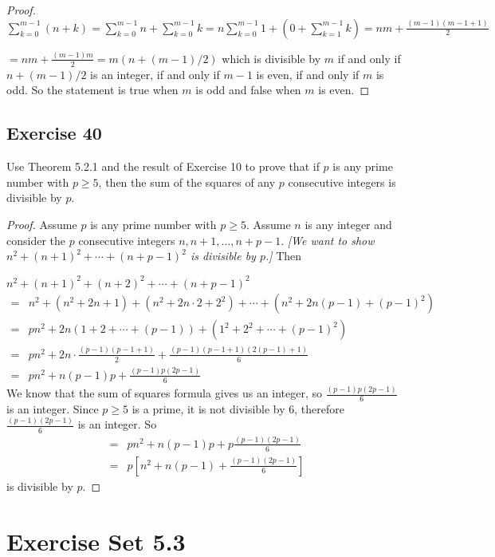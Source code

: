 \documentclass[14pt]{extarticle}
\newcommand{\dps}{\displaystyle}
\begin{document}
\begin{proof}
$\dps \sum_{k=0}^{m-1}(n+k) = \sum_{k=0}^{m-1}n + \sum_{k=0}^{m-1}k = n\sum_{k=0}^{m-1}1 + (0 + \sum_{k=1}^{m-1}k) = nm + \frac{(m-1)(m-1+1)}{2}$

$\dps = nm + \frac{(m-1)m}{2} = m(n + (m-1)/2)$ which is divisible by $m$ if and only if $n + (m-1)/2$ is an integer, if and only if $m-1$ is even, if and only if $m$ is odd. So the statement is true when $m$ is odd and false when $m$ is even.
\end{proof}

\subsection{Exercise 40}
Use Theorem 5.2.1 and the result of Exercise 10 to prove that if $p$ is any prime number with $p \geq 5$, then the sum of the squares of any $p$ consecutive integers is divisible by $p$.

\begin{proof}
Assume $p$ is any prime number with $p \geq 5$. Assume $n$ is any integer and consider the $p$ consecutive integers $n, n+1, \ldots, n+p-1$. {\it [We want to show $n^2 + (n+1)^2 + \cdots + (n+p-1)^2$ is divisible by $p$.]} Then

$n^2 + (n+1)^2 + (n+2)^2 + \cdots + (n+p-1)^2$
\[
\begin{array}{lll}
= & n^2 + (n^2 + 2n + 1) + (n^2 + 2n \cdot 2 + 2^2) + \cdots + (n^2 + 2n(p-1) + (p-1)^2) \\
= & pn^2 + 2n(1 + 2 + \cdots + (p-1)) + (1^2 + 2^2 + \cdots + (p-1)^2) \\
= & \dps pn^2 + 2n \cdot \frac{(p-1)(p-1+1)}{2} + \frac{(p-1)(p-1+1)(2(p-1)+1)}{6} \\
= & \dps pn^2 + n(p-1)p + \frac{(p-1)p(2p-1)}{6}
\end{array}
\]
We know that the sum of squares formula gives us an integer, so $\dps \frac{(p-1)p(2p-1)}{6}$ is an integer. Since $p \geq 5$ is a prime, it is not divisible by 6, therefore $\dps\frac{(p-1)(2p-1)}{6}$ is an integer. So
\[
\begin{array}{lll}
= & \dps pn^2 + n(p-1)p + p\frac{(p-1)(2p-1)}{6} \\
= & \dps p\left[n^2 + n(p-1) + \frac{(p-1)(2p-1)}{6}\right] 
\end{array}
\]
is divisible by $p$.
\end{proof}

\section{Exercise Set 5.3}
\end{document}
